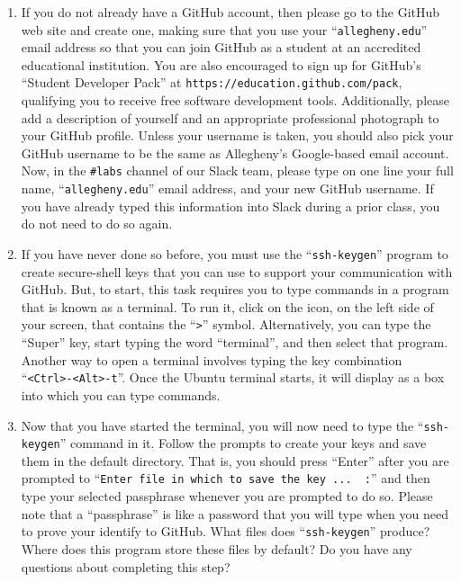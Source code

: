 \documentclass[11pt]{article}
\newcommand{\command}[1]{``\lstinline{#1}''}
\newcommand{\url}[1]{\lstinline{#1}}
\newcommand{\channel}[1]{\lstinline{#1}}
\begin{document}
\begin{enumerate}

  \item If you do not already have a GitHub account, then please go to the GitHub web site and create one, making sure
    that you use your \command{allegheny.edu} email address so that you can join GitHub as a student at an accredited
    educational institution. You are also encouraged to sign up for GitHub's ``Student Developer Pack'' at
    \url{https://education.github.com/pack}, qualifying you to receive free software development tools. Additionally,
    please add a description of yourself and an appropriate professional photograph to your GitHub profile. Unless your
    username is taken, you should also pick your GitHub username to be the same as Allegheny's Google-based email
    account. Now, in the \channel{#labs} channel of our Slack team, please type on one line your full name,
    \command{allegheny.edu} email address, and your new GitHub username. If you have already typed this information into
    Slack during a prior class, you do not need to do so again.

  \item If you have never done so before, you must use the \command{ssh-keygen} program to create secure-shell keys that
    you can use to support your communication with GitHub. But, to start, this task requires you to type commands in a
    program that is known as a terminal. To run it, click on the icon, on the left side of your screen, that contains
    the \command{>} symbol. Alternatively, you can type the ``Super'' key, start typing the word ``terminal'', and then
    select that program. Another way to open a terminal involves typing the key combination \command{<Ctrl>-<Alt>-t}.
    Once the Ubuntu terminal starts, it will display as a box into which you can type commands.

  \item Now that you have started the terminal, you will now need to type the \command{ssh-keygen} command in it. Follow
    the prompts to create your keys and save them in the default directory. That is, you should press ``Enter'' after
    you are prompted to \command{Enter file in which to save the key ...  :} and then type your selected passphrase
    whenever you are prompted to do so. Please note that a ``passphrase'' is like a password that you will type when you
    need to prove your identify to GitHub. What files does \command{ssh-keygen} produce? Where does this program store
    these files by default? Do you have any questions about completing this step?


\end{enumerate}
\end{document}
